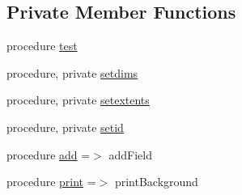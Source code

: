\subsection*{Private Member Functions}
\begin{DoxyCompactItemize}
\item 
procedure \mbox{\hyperlink{structbackground__mod_1_1background__class_abe7c9e689ba522cbd15754980ef1cc47}{test}}
\item 
procedure, private \mbox{\hyperlink{structbackground__mod_1_1background__class_a5a4418427175db3e0d549fc328369993}{setdims}}
\item 
procedure, private \mbox{\hyperlink{structbackground__mod_1_1background__class_a2265e90a0a0685465a17721576919af5}{setextents}}
\item 
procedure, private \mbox{\hyperlink{structbackground__mod_1_1background__class_aa9fde21edbd805c17a6610d9db2ef4a4}{setid}}
\item 
procedure \mbox{\hyperlink{structbackground__mod_1_1background__class_adbf91df5efe766dead76d836cb0663c4}{add}} =$>$ add\+Field
\item 
procedure \mbox{\hyperlink{structbackground__mod_1_1background__class_aa1c611fb6813d423cba8f53bdf25465d}{print}} =$>$ print\+Background
\end{DoxyCompactItemize}
